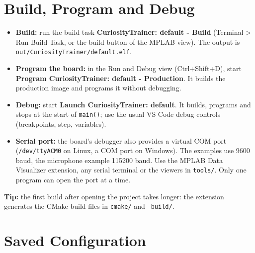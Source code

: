 \documentclass[
  11pt,
  letterpaper,
  oneside,
  DIV=13,               %
  parskip=half,          %
  headings=normal,
  chapterprefix=false,
  toc=listof,
  numbers=noenddot,
]{scrbook}
\begin{document}
\chapter{Build, Program and Debug}\label{ch-env-build}
\begin{itemize}
\item \textbf{Build:} run the build task \textbf{CuriosityTrainer: default - Build} (Terminal > Run Build Task, or the build button of the MPLAB view). The output is \texttt{out/\allowbreak{}CuriosityTrainer/\allowbreak{}default.\allowbreak{}elf}.
\item \textbf{Program the board:} in the Run and Debug view (Ctrl+Shift+D), start \textbf{Program CuriosityTrainer: default - Production}. It builds the production image and programs it without debugging.
\item \textbf{Debug:} start \textbf{Launch CuriosityTrainer: default}. It builds, programs and stops at the start of \texttt{main()}; use the usual VS Code debug controls (breakpoints, step, variables).
\item \textbf{Serial port:} the board's debugger also provides a virtual COM port (\texttt{/\allowbreak{}dev/\allowbreak{}ttyACM0} on Linux, a COM port on Windows). The examples use 9600 baud, the microphone example 115200 baud. Use the MPLAB Data Visualizer extension, any serial terminal or the viewers in \texttt{tools/\allowbreak{}}. Only one program can open the port at a time.
\end{itemize}
\begin{notebox}\textbf{Tip:} the first build after opening the project takes longer: the extension generates the CMake build files in \texttt{cmake/\allowbreak{}} and \texttt{\_\allowbreak{}build/\allowbreak{}}.\end{notebox}

\chapter{Saved Configuration}\label{ch-env-saved}
\end{document}
